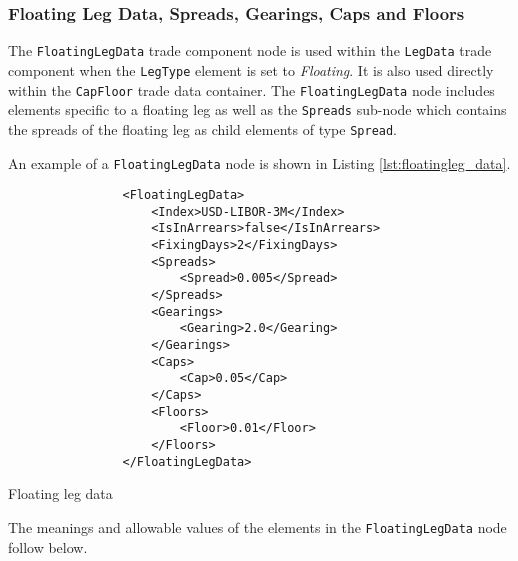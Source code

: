 \subsubsection{Floating Leg Data, Spreads, Gearings, Caps and Floors}
\label{ss:floatingleg_data}

The \lstinline!FloatingLegData! trade component node is used within the \lstinline!LegData! trade component when the
\lstinline!LegType! element is set to \emph{Floating}. It is also used directly within the \lstinline!CapFloor! trade
data container.  The \lstinline!FloatingLegData! node includes elements specific to a floating leg as well as the
\lstinline!Spreads! sub-node which contains the spreads of the floating leg as child elements of type
\lstinline!Spread!.

An example of a \lstinline!FloatingLegData! node is shown in Listing \ref{lst:floatingleg_data}.
\begin{listing}[H]
\begin{verbatim}
                <FloatingLegData>
                    <Index>USD-LIBOR-3M</Index>
                    <IsInArrears>false</IsInArrears>
                    <FixingDays>2</FixingDays>
                    <Spreads>
                        <Spread>0.005</Spread>
                    </Spreads>
                    <Gearings>
                        <Gearing>2.0</Gearing>
                    </Gearings>
                    <Caps>
                        <Cap>0.05</Cap>
                    </Caps>
                    <Floors>
                        <Floor>0.01</Floor>
                    </Floors>
                </FloatingLegData>
\end{verbatim}
\caption{Floating leg data}
\label{lst:floatingleg_data}
\end{listing}

The meanings and allowable values of the elements in the \lstinline!FloatingLegData! node follow below.

